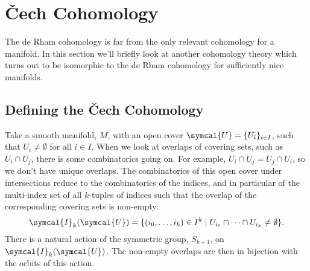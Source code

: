 \documentclass[fleqn]{NotesClass}
\newcommand{\openCover}{\symcal{U}}
\begin{document}
    \section{\v{C}ech Cohomology}
    The de Rham cohomology is far from the only relevant cohomology for a manifold.
    In this section we'll briefly look at another cohomology theory which turns out to be isomorphic to the de Rham cohomology for sufficiently nice manifolds.
    
    \subsection{Defining the \v{C}ech Cohomology}
    Take a smooth manifold, \(M\), with an open cover \(\openCover = \{U_i\}_{i \in I}\), such that \(U_i \ne \emptyset\) for all \(i \in I\).
    When we look at overlaps of covering sets, such as \(U_i \cap U_j\), there is some combinatorics going on.
    For example, \(U_i \cap U_j = U_j \cap U_i\), so we don't have unique overlaps.
    The combinatorics of this open cover under intersections reduce to the combinatorics of the indices, and in particular of the multi-index set of all \(k\)-tuples of indices such that the overlap of the corresponding covering sets is non-empty:
    \begin{equation}
        \symcal{I}_k(\openCover) = \{(i_0, \dotsc, i_k) \in I^k \mid U_{i_0} \cap \dotsb \cap U_{i_k} \ne \emptyset\}.
    \end{equation}
    There is a natural action of the symmetric group, \(S_{k+1}\), on \(\symcal{I}_k(\openCover)\).
    The non-empty overlaps are then in bijection with the orbits of this action.
    
\end{document}
